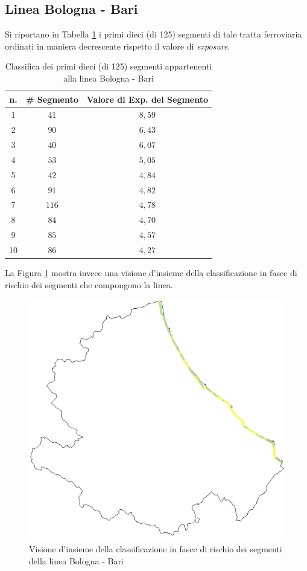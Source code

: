\subsection{Linea Bologna - Bari}
Si riportano in Tabella \ref{classificabolognabari} i primi dieci (di 125) segmenti di tale tratta ferroviaria ordinati in maniera decrescente rispetto il valore di \textit{exposure}.
\begin{table}[h]
\centering
\begin{tabular}{|c|c|c|}
\hline
\rowcolor{lightgray}
n. & \# Segmento & Valore di Exp. del Segmento \\ \hline \rowcolor{icterine}
1  & $41$        & $8,59$                      \\ \hline \rowcolor{icterine}
2  & $90$        & $6,43$                      \\ \hline \rowcolor{icterine}
3  & $40$        & $6,07$                      \\ \hline \rowcolor{icterine}
4  & $53$        & $5,05$                      \\ \hline \rowcolor{icterine}
5  & $42$        & $4,84$                      \\ \hline \rowcolor{icterine}
6  & $91$        & $4,82$                      \\ \hline \rowcolor{icterine}
7  & $116$       & $4,78$                      \\ \hline \rowcolor{icterine}
8  & $84$        & $4,70$                      \\ \hline \rowcolor{icterine}
9  & $85$        & $4,57$                      \\ \hline \rowcolor{icterine}
10 & $86$        & $4,27$                      \\ \hline
\end{tabular}
\caption{Classifica dei primi dieci (di 125) segmenti appartenenti alla linea Bologna - Bari}
\label{classificabolognabari}
\end{table}
\newline
La Figura \ref{bolognabari} mostra invece una visione d'insieme della classificazione in fasce di rischio dei segmenti che compongono la linea.
\begin{figure}[h]
\centering
\includegraphics[width=0.4\linewidth]{img/bolognabari.jpeg}
\caption{Visione d'insieme della classificazione in fasce di rischio dei segmenti della linea Bologna - Bari}
\label{bolognabari}
\end{figure}
